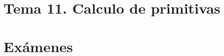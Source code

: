\documentclass[12pt, twoside, openright]{report} %
\begin{document}
\part{Tema 11. Calculo de primitivas}




\part{Exámenes}













\end{document}
